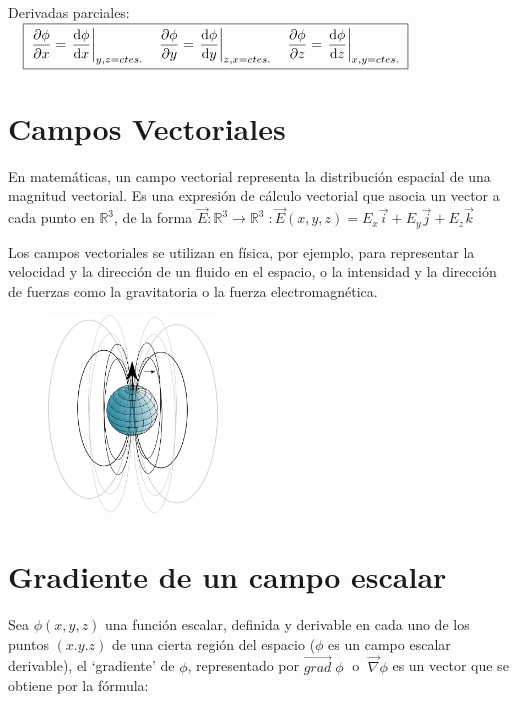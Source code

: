 Derivadas parciales: $\quad \boxed{\; \dfrac{\partial \phi}{\partial x}=\eval {\dfrac {\dd \phi}{\dd x}}_{y,z=ctes.} \quad \dfrac{\partial \phi}{\partial y}=\eval {\dfrac {\dd \phi}{\dd y}}_{z,x=ctes.} \quad \dfrac{\partial \phi}{\partial z}=\eval {\dfrac {\dd \phi}{\dd z}}_{x,y=ctes.} \;} $

\section{Campos Vectoriales}
\begin{multicols}{2}
	En matemáticas, un campo vectorial representa la distribución espacial de una magnitud vectorial. Es una expresión de cálculo vectorial que asocia un vector a cada punto en $\mathbb R^3$, de la forma $\vec E: \mathbb R^3 \to \mathbb R^3 \; : \vec E (x,y,z)= E_x \vec i + E_y \vec j + E_z \vec k$
	
	Los campos vectoriales se utilizan en física, por ejemplo, para representar la velocidad y la dirección de un fluido en el espacio, o la intensidad y la dirección de fuerzas como la gravitatoria o la fuerza electromagnética.
	
	\begin{figure}[H]
	\centering
	\includegraphics[width=0.4\textwidth]{imagenes/imagenes10/T10IM20.png}
	\end{figure}
\end{multicols}

\section{Gradiente de un campo escalar}

Sea $\phi (x,y,z)$ una función escalar, definida y derivable en cada uno de los puntos $(x.y.z)$ de una cierta región del espacio ($\phi$ es un campo escalar derivable), el `gradiente' de $\phi$, representado por $\overrightarrow {grad}\;  \phi\; $ o   $\; \overrightarrow{\nabla} \phi$ es un vector que se obtiene por la fórmula:

